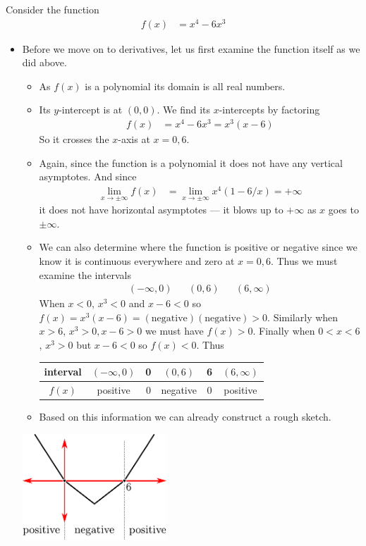 \begin{eg}\label{eg sketch simple poly}
Consider the function
\begin{align*}
  f(x) &= x^4-6x^3
\end{align*}

\begin{itemize}
 \item Before we move on to derivatives, let us first examine the function itself as we
did above.
\begin{itemize}
 \item As $f(x)$ is a polynomial its domain is all real numbers.
\item Its $y$-intercept is at $(0,0)$. We find its $x$-intercepts by factoring
\begin{align*}
  f(x) &=x^4-6x^3 = x^3(x-6)
\end{align*}
So it crosses the $x$-axis at $x=0,6$.

 \item Again, since the function is a polynomial it does not have any vertical
asymptotes. And since
\begin{align*}
  \lim_{x \to \pm \infty} f(x) &=
  \lim_{x \to \pm \infty} x^4(1-6/x) = +\infty
\end{align*}
it does not have horizontal asymptotes --- it blows up to $+\infty$ as $x$ goes to
$\pm\infty$.

\item We can also determine where the function is positive or negative since we
know it is continuous everywhere and zero at $x=0,6$. Thus we must examine the intervals
\begin{align*}
  (-\infty,0)&& (0,6) && (6,\infty)
\end{align*}
When $x<0$, $x^3<0$ and $x-6<0$ so $f(x) = x^3(x-6) = (\text{negative})(\text{negative})
> 0$. Similarly when $x>6$, $x^3>0, x-6>0$ we must have $f(x)>0$. Finally when $0<x<6$,
$x^3>0$ but $x-6<0$ so $f(x)<0$. Thus
\begin{center}
\begin{tabular}{|c|c||c||c||c||c|}
\hline
interval & $(-\infty,0)$ & 0 & $(0,6)$ & 6 & $(6,\infty)$\\
\hline
$f(x)$ & positive & 0 & negative & 0 & positive \\
\hline
\end{tabular}
\end{center}
\item Based on this information we can already construct a rough sketch.
\end{itemize}
\begin{efig}
 \begin{center}
  \includegraphics[height=4cm]{extra/sketch1}
 \end{center}
\end{efig}


\end{itemize}
\end{eg}
